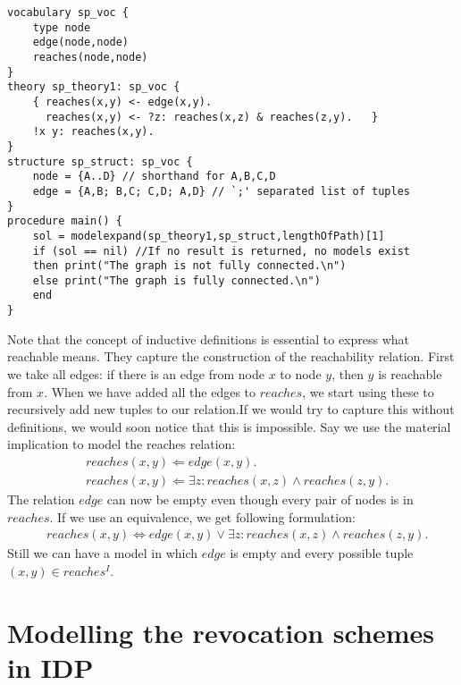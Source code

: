 \documentclass[runningheads]{llncs}
\begin{document}
\begin{lstlisting}[caption={Calling main() solves the graph connectivity problem for the given data.},label={mincolor}]
vocabulary sp_voc {
    type node
    edge(node,node)
    reaches(node,node)
}
theory sp_theory1: sp_voc {
    { reaches(x,y) <- edge(x,y).
      reaches(x,y) <- ?z: reaches(x,z) & reaches(z,y).   }
    !x y: reaches(x,y).  
}
structure sp_struct: sp_voc {
    node = {A..D} // shorthand for A,B,C,D
    edge = {A,B; B,C; C,D; A,D} // `;' separated list of tuples
}
procedure main() {
    sol = modelexpand(sp_theory1,sp_struct,lengthOfPath)[1]
    if (sol == nil) //If no result is returned, no models exist
    then print("The graph is not fully connected.\n")
    else print("The graph is fully connected.\n")
    end
}
\end{lstlisting}
Note that the concept of inductive definitions is essential to express what reachable means. 
They capture the construction of the reachability relation. 
First we take all edges: if there is an edge from node $x$ to node $y$, then $y$ is reachable from $x$. 
When we have added all the edges to $reaches$, we start using these to recursively add new tuples to our relation.If we would try to capture this without definitions, we would soon notice that this is impossible. Say we use the material implication to model the reaches relation:  \\[-25pt]
\begin{align*} 
  & reaches(x,y) \Leftarrow edge(x,y).\\
  & reaches(x,y) \Leftarrow \exists z : reaches(x,z) \land reaches(z,y).
\end{align*}
The relation $edge$ can now be empty even though every pair of nodes is in $reaches$. If we use an equivalence, we get following formulation: \\[-15pt]
\begin{align*} 
  & reaches(x,y) \Leftrightarrow edge(x,y)  \lor \exists z :reaches(x,z) \land reaches(z,y).
\end{align*}
Still we can have a model in which $edge$ is empty and every possible tuple $(x,y)\in reaches^I$.


 

\makeatletter{}\section{Modelling the revocation schemes in IDP}
\label{prototyping}
\end{document}
